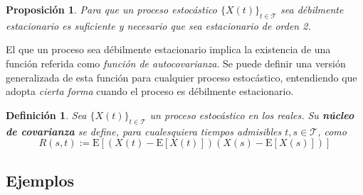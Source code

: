 \documentclass[12pt,letterpaper]{book}
\newtheorem{definicion}{Definición}[chapter]
\newtheorem{proposicion}[teorema]{Proposición}
\newcommand{\E}[1]{\mathrm{E}\left[ #1 \right]}
\newcommand{\xt}{$\{X(t)\}_{t\in \mathcal{T}}$ }
\begin{document}
\begin{proposicion}
Para que un proceso estocástico \xt sea débilmente estacionario es suficiente y necesario que sea estacionario de orden 2.
\end{proposicion}

El que un proceso sea débilmente estacionario implica la existencia de una función referida como \textit{función de autocovarianza}.
%
Se puede definir una versión generalizada de esta función para cualquier proceso estocástico, entendiendo que adopta \textit{cierta forma} cuando el proceso es débilmente estacionario.

\begin{definicion}
Sea \xt un proceso estocástico en los reales. Su \textbf{núcleo de covarianza} se define, para cualesquiera tiempos admisibles $t,s\in\mathcal{T}$, como
\begin{equation}
R(s,t) := \E{{\left( X(t)-\E{X(t)} \right)}\left( X(s)-\E{X(s)} \right)}
\end{equation}
\end{definicion}


\subsection{Ejemplos}
\end{document}
